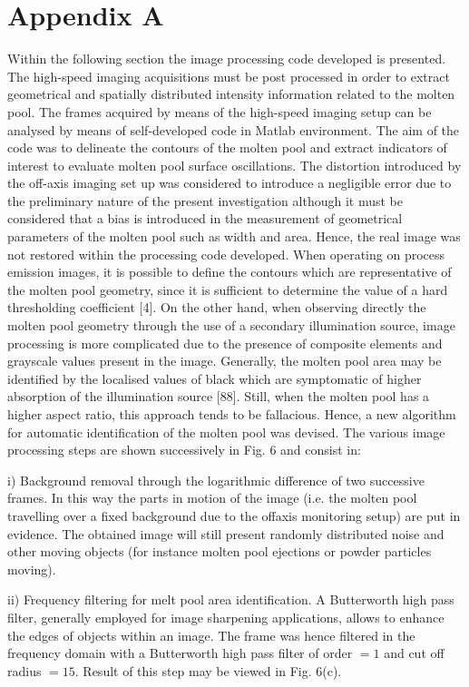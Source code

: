 \documentclass[10pt]{article}
\begin{document}
\section*{Appendix A}
Within the following section the image processing code developed is presented. The high-speed imaging acquisitions must be post processed in order to extract geometrical and spatially distributed intensity information related to the molten pool. The frames acquired by means of the high-speed imaging setup can be analysed by means of self-developed code in Matlab environment. The aim of the code was to delineate the contours of the molten pool and extract indicators of interest to evaluate molten pool surface oscillations. The distortion introduced by the off-axis imaging set up was considered to introduce a negligible error due to the preliminary nature of the present investigation although it must be considered that a bias is introduced in the measurement of geometrical parameters of the molten pool such as width and area. Hence, the real image was not restored within the processing code developed. When operating on process emission images, it is possible to define the contours which are representative of the molten pool geometry, since it is sufficient to determine the value of a hard thresholding coefficient [4]. On the other hand, when observing directly the molten pool geometry through the use of a secondary illumination source, image processing is more complicated due to the presence of composite elements and grayscale values present in the image. Generally, the molten pool area may be identified by the localised values of black which are symptomatic of higher absorption of the illumination source [88]. Still, when the molten pool has a higher aspect ratio, this approach tends to be fallacious. Hence, a new algorithm for automatic identification of the molten pool was devised. The various image processing steps are shown successively in Fig. 6 and consist in:

i) Background removal through the logarithmic difference of two successive frames. In this way the parts in motion of the image (i.e. the molten pool travelling over a fixed background due to the offaxis monitoring setup) are put in evidence. The obtained image will still present randomly distributed noise and other moving objects (for instance molten pool ejections or powder particles moving).

ii) Frequency filtering for melt pool area identification. A Butterworth high pass filter, generally employed for image sharpening applications, allows to enhance the edges of objects within an image. The frame was hence filtered in the frequency domain with a Butterworth high pass filter of order $=1$ and cut off radius $=15$. Result of this step may be viewed in Fig. 6(c).
\end{document}
